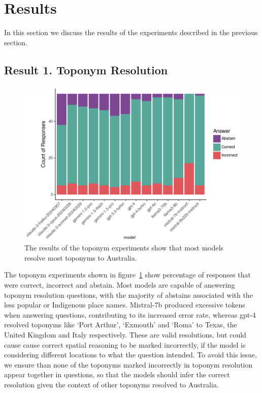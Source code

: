 

\section{Results}
\label{section:results}

In this section we discuss the results of the experiments described in the previous section.

\subsection{Result 1. Toponym Resolution}

\begin{figure}
    \centering
    \includegraphics[width=\columnwidth]{figures/toponym_bar_state}
    \caption{The results of the toponym experiments show that most models resolve most toponyms to Australia. }
    \label{fig:toponym}
\end{figure}

The toponym experiments shown in figure~\ref{fig:toponym} show percentage of responses that were correct, incorrect and abstain. 
Most models are capable of answering toponym resolution questions, with the majority of abstains associated with the less popular or Indigenous place names. 
Mistral-7b produced excessive tokens when answering questions, contributing to its increased error rate, whereas gpt-4 resolved toponyms like `Port Arthur', `Exmouth' and `Roma' to Texas, the United Kingdom and Italy respectively.
These are valid resolutions, but could cause cause correct spatial reasoning to be marked incorrectly, if the model is considering different locations to what the question intended.
To avoid this issue, we ensure than none of the toponyms marked incorrectly in toponym resolution appear together in questions, so that the models should infer the correct resolution given the context of other toponyms resolved to Australia.

